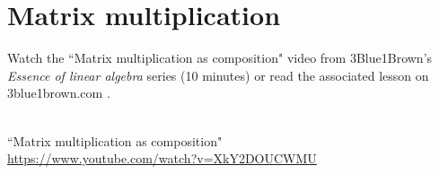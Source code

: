 \section{Matrix multiplication}

Watch the ``Matrix multiplication as composition" video from 3Blue1Brown's
\textit{Essence of linear algebra} series (10 minutes) or read the associated
lesson on 3blue1brown.com
\cite{bib:3b1b_linalg_matrix_multiplication_as_composition}.
\begin{bookfigure}
   \\
  \tiny
  ``Matrix multiplication as composition" \\
  \url{https://www.youtube.com/watch?v=XkY2DOUCWMU}
\end{bookfigure}
